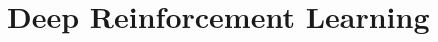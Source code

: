 \renewcommand{\prevpart}{8 }
\renewcommand{\thispart}{9 }
\renewcommand{\nextpart}{10 }

\section{Deep Reinforcement Learning}





